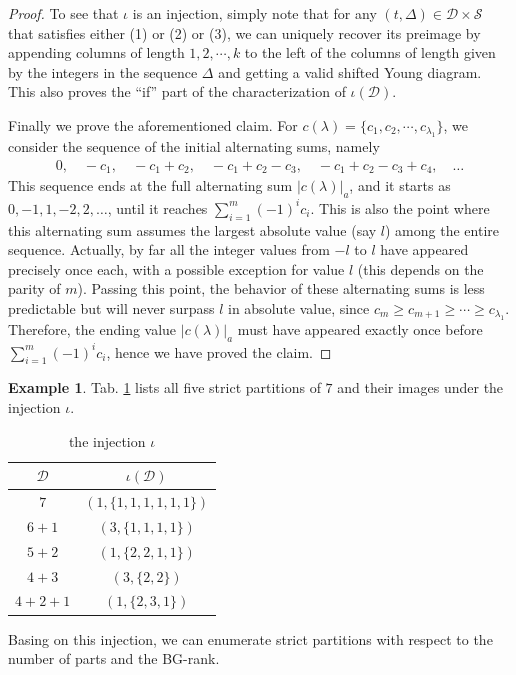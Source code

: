 \documentclass[12pt,reqno]{amsart}
\numberwithin{equation}{section}
\theoremstyle{plain}
\theoremstyle{definition}
\newtheorem{example}[theorem]{Example}
\newcommand{\s}{\mathcal{S}}
\newcommand{\D}{\mathcal{D}}
\begin{document}
\begin{proof}
To see that $\iota$ is an injection, simply note that for any $(t,\Delta)\in \D\times\s$ that satisfies either (1) or (2) or (3), we can uniquely recover its preimage by appending columns of length $1,2,\cdots,k$ to the left of the columns of length given by the integers in the sequence $\Delta$ and getting a valid shifted Young diagram. This also proves the ``if'' part of the characterization of $\iota(\D)$.

Finally we prove the aforementioned claim. For $c(\lambda)=\{c_1,c_2,\cdots,c_{\lambda_1}\}$, we consider the sequence of the initial alternating sums, namely
\begin{align}
0, \quad -c_1, \quad -c_1+c_2, \quad -c_1+c_2-c_3, \quad -c_1+c_2-c_3+c_4, \quad \ldots
\end{align}
This sequence ends at the full alternating sum $|c(\lambda)|_a$, and it starts as $0,-1,1,-2,2,\ldots$, until it reaches $\sum_{i=1}^{m}(-1)^ic_i$. This is also the point where this alternating sum assumes the largest absolute value (say $l$) among the entire sequence. Actually, by far all the integer values from $-l$ to $l$ have appeared precisely once each, with a possible exception for value $l$ (this depends on the parity of $m$). Passing this point, the behavior of these alternating sums is less predictable but will never surpass $l$ in absolute value, since $c_m\ge c_{m+1}\ge\cdots\ge c_{\lambda_1}$. Therefore, the ending value $|c(\lambda)|_a$ must have appeared exactly once before $\sum_{i=1}^{m}(-1)^{i}c_{i}$, hence we have proved the claim.
\end{proof}
\begin{example}
Tab. \ref{D:table} lists all five strict partitions of $7$ and their images under the injection $\iota$.
\begin{table}[tbp]\caption{the injection $\iota$}\label{D:table}
\centering
\begin{tabular}{c|c}
\hline
 $\D$ & $\iota(\D)$\\
\hline
$7$ & $(1,\{1,1,1,1,1,1\})$ \\
$6+1$ & $(3,\{1,1,1,1\})$ \\
$5+2$ & $(1,\{2,2,1,1\})$ \\
$4+3$ & $(3,\{2,2\})$ \\
$4+2+1$ & $(1,\{2,3,1\})$ \\
\hline
\end{tabular}
\end{table}
\end{example}
Basing on this injection, we can enumerate strict partitions with respect to the number of parts and the BG-rank.
\end{document}
